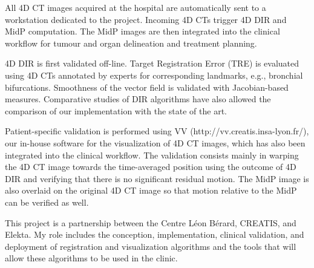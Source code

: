 \documentclass[a4paper]{article}
\begin{document}
All 4D CT images acquired at the hospital are automatically sent to a workstation dedicated to the project. Incoming 4D CTs trigger 4D DIR and MidP computation. The MidP images are then integrated into the clinical workflow for tumour and organ delineation and treatment planning. 

4D DIR is first validated off-line. Target Registration Error (TRE) is evaluated using 4D CTs annotated by experts for corresponding landmarks, e.g., bronchial bifurcations. Smoothness of the vector field is  validated with Jacobian-based measures. Comparative studies of DIR algorithms have also allowed the comparison of our implementation with the state of the art.

Patient-specific validation is performed using VV (http://vv.creatis.insa-lyon.fr/), our in-house software for the visualization of 4D CT images, which has also been integrated into the clinical workflow. The validation consists mainly in warping the 4D CT image towards the time-averaged position using the outcome of 4D DIR and verifying that there is no significant residual motion. The MidP image is also overlaid on the original 4D CT image so that motion relative to the MidP can be verified as well.

This project is a partnership between the Centre L\'eon B\'erard, CREATIS, and Elekta. My role includes the conception,  implementation, clinical validation, and deployment of registration and visualization algorithms and the tools that will allow these algorithms to be used in the clinic. 

\renewcommand{\refname}{Related publications}
\begin{bibunit}[unsrt]
\nocite{DELM-11}
\nocite{PINH-11}
\nocite{RIT-11b}
\putbib[mybib]
\end{bibunit}
\end{document}
